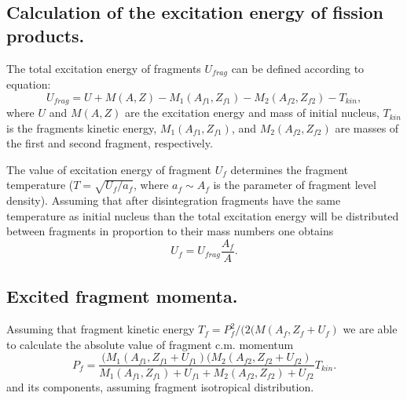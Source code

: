 \subsection{Calculation of the excitation energy of fission products.}

\hspace{1.0em}The total excitation energy of fragments $U_{frag}$ 
can be defined according to equation:
\begin{equation}
\label{FPS21} U_{frag} = U + M(A,Z) - M_1(A_{f1}, Z_{f1}) - M_2(A_{f2}, Z_{f2}) - 
T_{kin},
\end{equation}
where $U$ and $M(A,Z)$ are the excitation energy and mass of initial
nucleus, $T_{kin}$ is the fragments kinetic energy, $M_1(A_{f1},
Z_{f1})$,  and $M_2(A_{f2}, Z_{f2})$ are masses
of the first and second fragment, respectively.

The value of excitation energy of fragment $U_f$ determines the fragment
temperature ($T = \sqrt{U_f/a_f}$, where $a_f \sim A_f$ is the parameter
of fragment level density).  Assuming that after disintegration
fragments have the same temperature as initial nucleus than the total
excitation energy will be distributed between fragments in proportion to
their mass numbers one obtains
\begin{equation}
\label{FPS22} U_f = U_{frag} \frac{A_f}{A}.
\end{equation}

\subsection{Excited fragment momenta.}

\hspace{1.0em}Assuming that fragment kinetic energy $T_f= 
P^2_f/(2(M(A_{f},Z_{f}+U_f)$ we are 
able to calculate the absolute value of fragment c.m. momentum 
\begin{equation}
\label{FPS23}
P_f=\frac{(M_1(A_{f1},Z_{f1}+U_{f1})(M_2(A_{f2},Z_{f2}+U_{f2})}{
M_1(A_{f1},Z_{f1})+U_{f1} + M_2(A_{f2},Z_{f2})+U_{f2}}T_{kin}.
\end{equation}
and its components, assuming fragment isotropical distribution.
